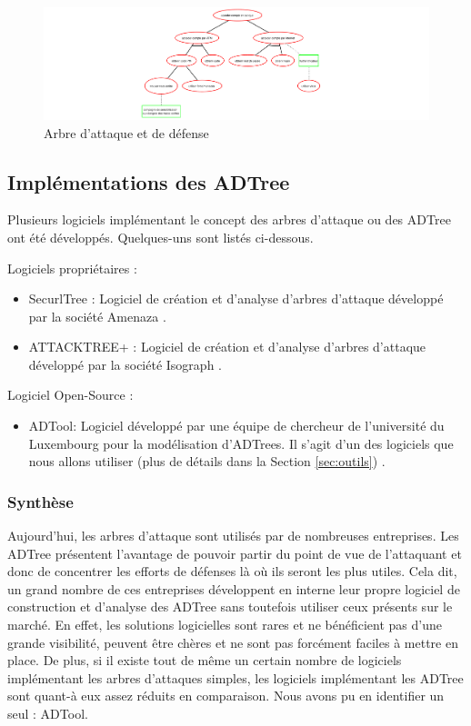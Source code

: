         \begin{figure}[h]
	        \centering
	        \includegraphics[width=1\textwidth]{figure/exemple2_rapport.pdf}
	        \caption{Arbre d'attaque et de défense}
	        \label{fig:arbre_exemple_3}
        \end{figure}

	\subsection{Implémentations des ADTree}
		Plusieurs logiciels implémentant le concept des arbres d'attaque ou des ADTree ont été développés. Quelques-uns sont listés ci-dessous.
        
        Logiciels propriétaires :
        \begin{itemize}
	        \item SecurlTree : Logiciel de création et d'analyse d'arbres d'attaque développé par la société Amenaza \cite{SecurlTree}.
	        \item ATTACKTREE+ : Logiciel de création et d'analyse d'arbres d'attaque développé par la société Isograph \cite{ATTACKTREE+}.
        \end{itemize}
        
        Logiciel Open-Source :
        \begin{itemize}
        	\item ADTool: Logiciel développé par une équipe de chercheur de l'université du Luxembourg pour la modélisation d'ADTrees. Il s'agit d'un des logiciels que nous allons utiliser (plus de détails dans la Section \ref{sec:outils}) \cite{ADTool}.
        \end{itemize}

        \subsubsection{Synthèse}
            Aujourd'hui, les arbres d'attaque sont utilisés par de nombreuses entreprises. Les ADTree présentent l'avantage de pouvoir partir du point de vue de l'attaquant et donc de concentrer les efforts de défenses là où ils seront les plus utiles. Cela dit, un grand nombre de ces entreprises développent en interne leur propre logiciel de construction et d'analyse des ADTree sans toutefois utiliser ceux présents sur le marché. En effet, les solutions logicielles sont rares et ne bénéficient pas d'une grande visibilité, peuvent être chères et ne sont pas forcément faciles à mettre en place. De plus, si il existe tout de même un certain nombre de logiciels implémentant les arbres d'attaques simples, les logiciels implémentant les ADTree sont quant-à eux assez réduits en comparaison. Nous avons pu en identifier un seul : ADTool. 

